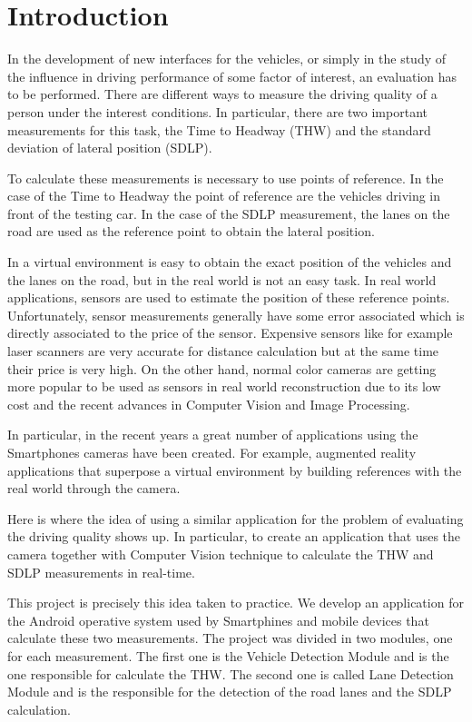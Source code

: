 \chapter{Introduction} \label{cha:introduction}

In the development of new interfaces for the vehicles, or simply in the study of 
the influence in driving performance of some factor of interest, an evaluation
has to be performed. There are different ways to measure the driving quality of
a person under the interest conditions. In particular, there are two important
measurements for this task, the Time to Headway (THW) and the standard deviation
of lateral position (SDLP).

To calculate these measurements is necessary to use points of reference. In the
case of the Time to Headway the point of reference are the vehicles driving in
front of the testing car. In the case of the SDLP measurement, the lanes on the
road are used as the reference point to obtain the lateral position.

In a virtual environment is easy to obtain the exact position of the vehicles
and the lanes on the road, but in the real world is not an easy task. In real
world applications, sensors are used to estimate the position of these reference
points. Unfortunately, sensor measurements generally have some error associated
which is directly associated to the price of the sensor. Expensive sensors like
for example laser scanners are very accurate for distance calculation but at the
same time their price is very high. On the other hand, normal color cameras are
getting more popular to be used as sensors in real world reconstruction due to
its low cost and the recent advances in Computer Vision and Image Processing.

In particular, in the recent years a great number of applications using the
Smartphones cameras have been created. For example, augmented reality
applications that superpose a virtual environment by building references with
the real world through the camera.

Here is where the idea of using a similar application for the problem of
evaluating the driving quality shows up. In particular, to create an application
that uses the camera together with Computer Vision technique to calculate the
THW and SDLP measurements in real-time.

This project is precisely this idea taken to practice. We develop an application
for the Android operative system used by Smartphines and mobile devices that
calculate these two measurements. The project was divided in two modules, one
for each measurement. The first one is the Vehicle Detection Module and is the
one responsible for calculate the THW. The second one is called Lane Detection
Module and is the responsible for the detection of the road lanes and the SDLP
calculation.
